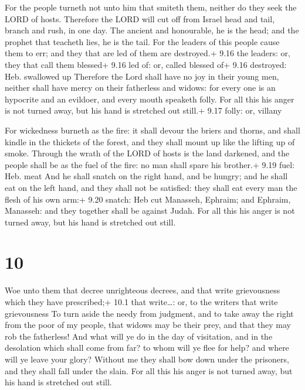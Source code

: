  For the people turneth not unto him that smiteth them,
neither do they seek the LORD of hosts.  Therefore the LORD
will cut off from Israel head and tail, branch and rush, in one day.
 The ancient and honourable, he is the head; and the
prophet that teacheth lies, he is the tail.  For the
leaders of this people cause them to err; and they that are led of them
are destroyed.+ 9.16 the leaders: or, they that call them blessed+ 9.16
led of: or, called blessed of+ 9.16 destroyed: Heb. swallowed up
 Therefore the Lord shall have no joy in their young men,
neither shall have mercy on their fatherless and widows: for every one
is an hypocrite and an evildoer, and every mouth speaketh folly. For all
this his anger is not turned away, but his hand is stretched out still.+
9.17 folly: or, villany

 For wickedness burneth as the fire: it shall devour the
briers and thorns, and shall kindle in the thickets of the forest, and
they shall mount up like the lifting up of smoke.  Through
the wrath of the LORD of hosts is the land darkened, and the people
shall be as the fuel of the fire: no man shall spare his brother.+ 9.19
fuel: Heb. meat  And he shall snatch on the right hand, and
be hungry; and he shall eat on the left hand, and they shall not be
satisfied: they shall eat every man the flesh of his own arm:+ 9.20
snatch: Heb cut  Manasseh, Ephraim; and Ephraim, Manasseh:
and they together shall be against Judah. For all this his anger is not
turned away, but his hand is stretched out still.

\hypertarget{section-9}{%
\section{10}\label{section-9}}

 Woe unto them that decree unrighteous decrees, and that
write grievousness which they have prescribed;+ 10.1 that write\ldots:
or, to the writers that write grievousness  To turn aside
the needy from judgment, and to take away the right from the poor of my
people, that widows may be their prey, and that they may rob the
fatherless!  And what will ye do in the day of visitation,
and in the desolation which shall come from far? to whom will ye flee
for help? and where will ye leave your glory?  Without me
they shall bow down under the prisoners, and they shall fall under the
slain. For all this his anger is not turned away, but his hand is
stretched out still.


